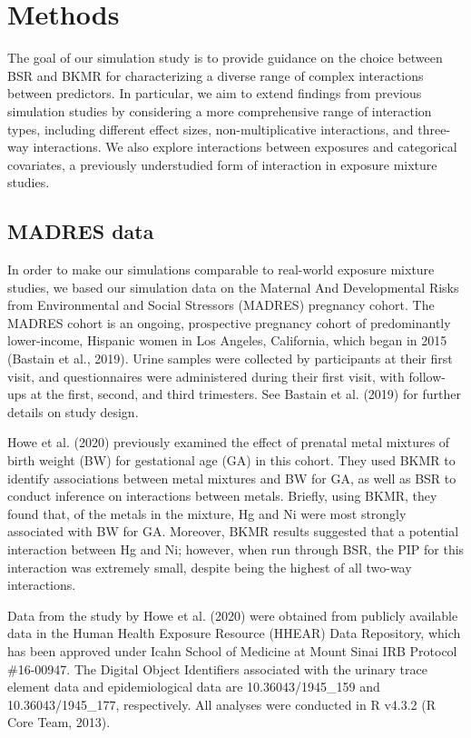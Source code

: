 \documentclass[12pt, twoside]{amherstthesis}
\begin{document}
\hypertarget{methods}{%
\section{Methods}\label{methods}}

The goal of our simulation study is to provide guidance on the choice between BSR and BKMR for characterizing a diverse range of complex interactions between predictors. In particular, we aim to extend findings from previous simulation studies by considering a more comprehensive range of interaction types, including different effect sizes, non-multiplicative interactions, and three-way interactions. We also explore interactions between exposures and categorical covariates, a previously understudied form of interaction in exposure mixture studies.

\hypertarget{madres}{%
\subsection{MADRES data}\label{madres}}

In order to make our simulations comparable to real-world exposure mixture studies, we based our simulation data on the Maternal And Developmental Risks from Environmental and Social Stressors (MADRES) pregnancy cohort. The MADRES cohort is an ongoing, prospective pregnancy cohort of predominantly lower-income, Hispanic women in Los Angeles, California, which began in 2015 (Bastain et al., 2019). Urine samples were collected by participants at their first visit, and questionnaires were administered during their first visit, with follow-ups at the first, second, and third trimesters. See Bastain et al. (2019) for further details on study design.

Howe et al. (2020) previously examined the effect of prenatal metal mixtures of birth weight (BW) for gestational age (GA) in this cohort. They used BKMR to identify associations between metal mixtures and BW for GA, as well as BSR to conduct inference on interactions between metals. Briefly, using BKMR, they found that, of the metals in the mixture, Hg and Ni were most strongly associated with BW for GA. Moreover, BKMR results suggested that a potential interaction between Hg and Ni; however, when run through BSR, the PIP for this interaction was extremely small, despite being the highest of all two-way interactions.

Data from the study by Howe et al. (2020) were obtained from publicly available data in the Human Health Exposure Resource (HHEAR) Data Repository, which has been approved under Icahn School of Medicine at Mount Sinai IRB Protocol \#16-00947. The Digital Object Identifiers associated with the urinary trace element data and epidemiological data are 10.36043/1945\_159 and 10.36043/1945\_177, respectively. All analyses were conducted in R v4.3.2 (R Core Team, 2013).
\end{document}
